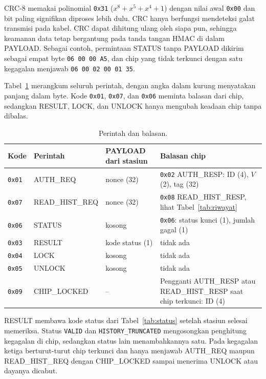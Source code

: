 \documentclass[11pt,a4paper]{article}
\begin{document}
CRC-8 memakai polinomial \texttt{0x31} ($x^8 + x^5 + x^4 + 1$) dengan nilai awal \texttt{0x00}
dan bit paling signifikan diproses lebih dulu. CRC hanya berfungsi mendeteksi galat transmisi
pada kabel. CRC dapat dihitung ulang oleh siapa pun, sehingga keamanan data tetap bergantung pada
tanda tangan HMAC di dalam PAYLOAD. Sebagai contoh, permintaan STATUS tanpa PAYLOAD dikirim
sebagai empat byte \texttt{06 00 00 A5}, dan chip yang tidak terkunci dengan satu kegagalan
menjawab \texttt{06 00 02 00 01 35}.

Tabel~\ref{tab:perintah} merangkum seluruh perintah, dengan angka dalam kurung menyatakan panjang
dalam byte. Kode \texttt{0x01}, \texttt{0x07}, dan
\texttt{0x06} meminta balasan dari chip, sedangkan RESULT, LOCK, dan UNLOCK hanya mengubah
keadaan chip tanpa dibalas.

\begin{table}[H]
  \centering
  \small
  \begin{tabularx}{\textwidth}{l l X X}
    \toprule
    Kode & Perintah & PAYLOAD dari stasiun & Balasan chip \\
    \midrule
    \texttt{0x01} & AUTH\_REQ & nonce (32) & \texttt{0x02} AUTH\_RESP: ID (4), $V$ (2), tag (32) \\
    \texttt{0x07} & READ\_HIST\_REQ & nonce (32) & \texttt{0x08} READ\_HIST\_RESP, lihat
      Tabel~\ref{tab:riwayat} \\
    \texttt{0x06} & STATUS & kosong & \texttt{0x06}: status kunci (1), jumlah gagal (1) \\
    \texttt{0x03} & RESULT & kode status (1) & tidak ada \\
    \texttt{0x04} & LOCK & kosong & tidak ada \\
    \texttt{0x05} & UNLOCK & kosong & tidak ada \\
    \midrule
    \texttt{0x09} & CHIP\_LOCKED & -- & Pengganti AUTH\_RESP atau READ\_HIST\_RESP saat chip
      terkunci: ID (4) \\
    \bottomrule
  \end{tabularx}
  \caption{Perintah dan balasan.}
  \label{tab:perintah}
\end{table}

RESULT membawa kode status dari Tabel~\ref{tab:status} setelah stasiun selesai memeriksa.
Status \texttt{VALID} dan \texttt{HISTORY\_TRUNCATED} mengosongkan penghitung kegagalan di chip,
sedangkan status lain menambahkannya satu. Pada kegagalan ketiga berturut-turut chip terkunci dan
hanya menjawab AUTH\_REQ maupun READ\_HIST\_REQ dengan CHIP\_LOCKED sampai menerima UNLOCK atau
dayanya dicabut.
\end{document}
